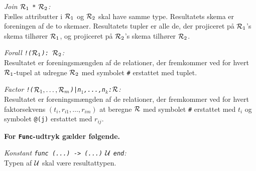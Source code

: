 \documentclass{article}
\begin{document}
{\em Join ${\cal R}_1$ \verb"*" ${\cal R}_2$:}\\
F\ae{}lles attributter i ${\cal R}_1$ og ${\cal R}_2$ skal have samme type.
Resultatets skema er foreningen af de to skemaer. 
Resultatets tupler er alle de, der projiceret p\aa{}
${\cal R}_1$'s skema tilh\o{}rer ${\cal R}_1$, og projiceret p\aa{}
${\cal R}_2$'s skema tilh\o{}rer ${\cal R}_2$.

{\em Forall \verb"!("${\cal R}_1$\verb"): "${\cal R}_2$:}\\
Resultatet er foreningsm\ae{}ngden af de relationer, 
der fremkommer ved for hvert
${\cal R}_1$-tupel at  udregne ${\cal R}_2$ med symbolet
\verb"#" erstattet med tuplet.

{\em Factor \verb"!("${\cal R}_1,\ldots,{\cal R}_m$\verb")|"\verb"n"$_1$\verb",...,n"$_k$\verb":"${\cal R}$:}\\
Resultatet er foreningsm\ae{}ngden af de relationer,
der fremkommer ved for hvert faktorsekvens $(t_i,r_{i1},\ldots,r_{im})$ at
beregne ${\cal R}$ med symbolet
\verb"#" erstattet med $t_i$ og symbolet \verb"@(j)" erstattet med $r_{ij}$.

{\bf For \verb"Func"-udtryk g\ae{}lder f\o{}lgende.}

{\em Konstant \verb"func (...) -> (...)" $\cal U$ \verb"end":}\\
Typen af $\cal U$ skal v\ae{}re resultattypen.
\end{document}
